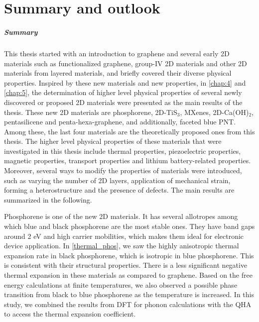 
\chapter{Summary and outlook}


\paragraph{Summary} This thesis started with an introduction to graphene and several early 2D materials such as functionalized graphene, group-IV 2D materials and other 2D materials from layered materials, and briefly covered their diverse physical properties. Inspired by these new materials and new properties, in \autoref{chap:4} and \autoref{chap:5}, the determination of higher level physical properties of several newly discovered or proposed 2D materials were presented as the main results of the thesis. These new 2D materials are phosphorene, 2D-TiS$_3$, MXenes, 2D-Ca(OH)$_2$, pentasilicene and penta-hexa-graphene, and additionally, faceted blue PNT. Among these, the last four materials are the theoretically proposed ones from this thesis. The higher level physical properties of these materials that were investigated in this thesis include thermal properties, piezoelectric properties, magnetic properties, transport properties and lithium battery-related properties. Moreover, several ways to modify the properties of materials were introduced, such as varying the number of 2D layers, application of mechanical strain, forming a heterostructure and the presence of defects. The main results are summarized in the following.

Phosphorene is one of the new 2D materials. It has several allotropes among which blue and black phosphorene are the most stable ones. They have band gaps around 2 eV and high carrier mobilities, which makes them ideal for electronic device application. In \autoref{thermal_phos}, we saw the highly anisotropic thermal expansion rate in black phosphorene, which is isotropic in blue phosphorene. This is consistent with their structural properties. There is a less significant negative thermal expansion in these materials as compared to graphene. Based on the free energy calculations at finite temperatures, we also observed a possible phase transition from black to blue phosphorene as the temperature is increased. In this study, we combined the results from DFT for phonon calculations with the QHA to access the thermal expansion coefficient.

